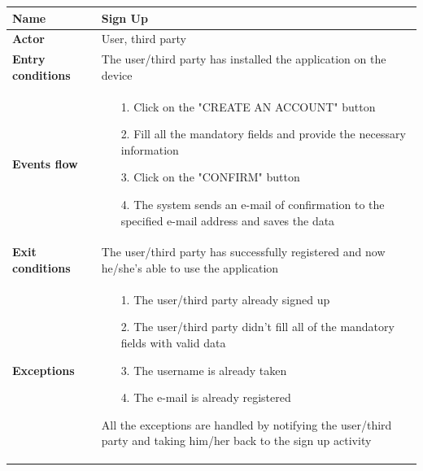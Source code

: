 \begin{table}[]
\begin{adjustbox}{width=\textwidth}
\footnotesize
\begin{tabular}{|p{}|p{}|}
\hline
\textbf{Name}             &  Sign Up\\ \hline
\textbf{Actor}            &  User, third party\\ \hline
\textbf{Entry conditions} &  The user/third party has installed the application on the device\\ \hline
\textbf{Events flow}      &
	\begin{itemize}
		\item[1.] Click on the "CREATE AN ACCOUNT" button
		\item[2.] Fill all the mandatory fields and provide the necessary information
		\item[3.] Click on the "CONFIRM" button
		\item[4.] The system sends an e-mail of confirmation to the specified e-mail address and saves the data
	\end{itemize}\\ \hline
\textbf{Exit conditions}  &  The user/third party has successfully registered and now he/she’s able to use the application\\ \hline
\textbf{Exceptions}       &
	\begin{itemize}
		\item[1.] The user/third party already signed up
		\item[2.] The user/third party didn’t fill all of the mandatory fields with valid data
		\item[3.] The username is already taken
		\item[4.] The e-mail is already registered
	\end{itemize}
	All the exceptions are handled by notifying the user/third party and taking him/her back to the sign up activity\\ \hline
\end{tabular}
\end{adjustbox}
\end{table}

